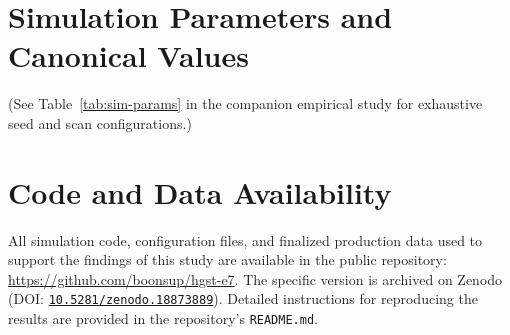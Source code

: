 \documentclass[12pt,a4paper]{article}
\theoremstyle{plain}
\theoremstyle{definition}
\theoremstyle{remark}
\begin{document}
\section{Simulation Parameters and Canonical Values}
\label{app:sim-params}
(See Table~\ref{tab:sim-params} in the companion empirical study for exhaustive seed and scan configurations.)






\section{Code and Data Availability}
\label{sec:availability}
All simulation code, configuration files, and finalized production data used to
support the findings of this study are available in the public repository:
\href{https://github.com/boonsup/hgst-e7}{https://github.com/boonsup/hgst-e7}.
The specific version is archived on Zenodo (DOI: \href{https://doi.org/10.5281/zenodo.18873889}{\texttt{10.5281/zenodo.18873889}}).
Detailed instructions for reproducing the results are provided in the
repository's \texttt{README.md}.
\end{document}
